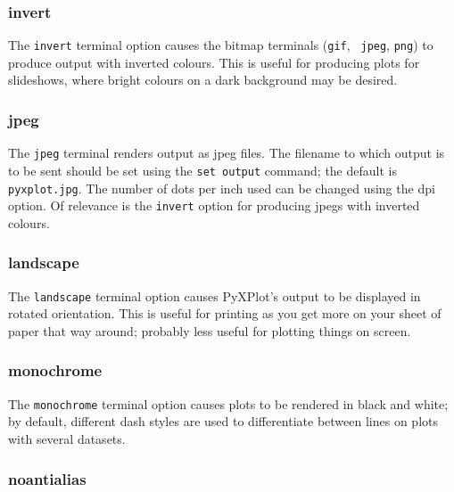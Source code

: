 \subsubsection{invert}

The {\tt invert} terminal option causes the bitmap terminals ({\tt gif}, {\tt
jpeg}, {\tt png}) to produce output with inverted colours. This is useful for
producing plots for slideshows, where bright colours on a dark background may be
desired.


\subsubsection{jpeg}

The {\tt jpeg} terminal renders output as jpeg files. The filename to which
output is to be sent should be set using the {\tt set output} command; the
default is {\tt pyxplot.jpg}.  The number of dots per inch used can be changed
using the dpi option. Of relevance is the {\tt invert} option for producing
jpegs with inverted colours.

\subsubsection{landscape}

The {\tt landscape} terminal option causes PyXPlot's output to be displayed in
rotated orientation.  This is useful for printing as you get more on your sheet
of paper that way around; probably less useful for plotting things on screen.

\subsubsection{monochrome}

The {\tt monochrome} terminal option causes plots to be rendered in black and
white; by default, different dash styles are used to differentiate between
lines on plots with several datasets.

\subsubsection{noantialias}

